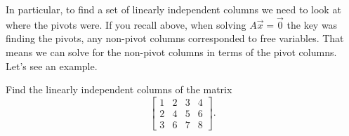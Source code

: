 In particular, to find a set of linearly independent columns we need to
look at where the pivots were.  If you recall above, when solving $A \vec{x}
= \vec{0}$ the key was finding the pivots, any non-pivot columns corresponded to
free variables.  That means we can solve for the non-pivot columns in terms
of the pivot columns.  Let's see an example. 
\begin{example}
Find the linearly independent columns of the matrix
\begin{equation*}
\begin{bmatrix}
1 & 2 & 3 & 4 \\
2 & 4 & 5 & 6 \\
3 & 6 & 7 & 8
\end{bmatrix} .
\end{equation*}
\end{example}
